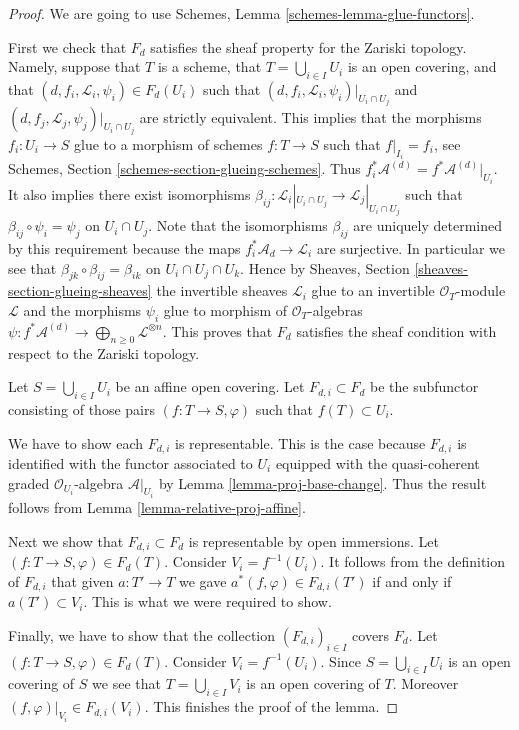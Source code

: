 \begin{proof}
We are going to use Schemes, Lemma \ref{schemes-lemma-glue-functors}.

\medskip\noindent
First we check that $F_d$ satisfies the sheaf property for the
Zariski topology. Namely, suppose that $T$ is a scheme,
that $T = \bigcup_{i \in I} U_i$ is an open covering,
and that $(d, f_i, \mathcal{L}_i, \psi_i) \in F_d(U_i)$ such that
$(d, f_i, \mathcal{L}_i, \psi_i)|_{U_i \cap U_j}$ and
$(d, f_j, \mathcal{L}_j, \psi_j)|_{U_i \cap U_j}$ are strictly
equivalent. This implies that the morphisms $f_i : U_i \to S$
glue to a morphism of schemes $f : T \to S$ such that
$f|_{I_i} = f_i$, see Schemes, Section \ref{schemes-section-glueing-schemes}.
Thus $f_i^*\mathcal{A}^{(d)} = f^*\mathcal{A}^{(d)}|_{U_i}$.
It also implies there exist isomorphisms
$\beta_{ij} : \mathcal{L}_i|_{U_i \cap U_j} \to \mathcal{L}_j|_{U_i \cap U_j}$
such that $\beta_{ij} \circ \psi_i = \psi_j$ on $U_i \cap U_j$.
Note that the isomorphisms $\beta_{ij}$ are uniquely determined
by this requirement because the maps $f_i^*\mathcal{A}_d \to \mathcal{L}_i$
are surjective. In particular we see that
$\beta_{jk} \circ \beta_{ij} = \beta_{ik}$ on $U_i \cap U_j \cap U_k$.
Hence by Sheaves,
Section \ref{sheaves-section-glueing-sheaves} the invertible sheaves
$\mathcal{L}_i$ glue to an invertible $\mathcal{O}_T$-module
$\mathcal{L}$ and the morphisms $\psi_i$ glue to
morphism of $\mathcal{O}_T$-algebras
$\psi : f^*\mathcal{A}^{(d)} \to \bigoplus_{n \geq 0} \mathcal{L}^{\otimes n}$.
This proves that $F_d$ satisfies the sheaf condition with respect to
the Zariski topology.

\medskip\noindent
Let $S = \bigcup_{i \in I} U_i$ be an affine open covering.
Let $F_{d, i} \subset F_d$ be the subfunctor consisting of
those pairs $(f : T \to S, \varphi)$ such that
$f(T) \subset U_i$.

\medskip\noindent
We have to show each $F_{d, i}$ is representable.
This is the case because $F_{d, i}$ is identified with
the functor associated to $U_i$ equipped with
the quasi-coherent graded $\mathcal{O}_{U_i}$-algebra
$\mathcal{A}|_{U_i}$ by Lemma \ref{lemma-proj-base-change}.
Thus the result follows from Lemma \ref{lemma-relative-proj-affine}.

\medskip\noindent
Next we show that $F_{d, i} \subset F_d$ is representable by open immersions.
Let $(f : T \to S, \varphi) \in F_d(T)$. Consider $V_i = f^{-1}(U_i)$.
It follows from the definition of $F_{d, i}$ that given $a : T' \to T$
we gave $a^*(f, \varphi) \in F_{d, i}(T')$ if and only if $a(T') \subset V_i$.
This is what we were required to show.

\medskip\noindent
Finally, we have to show that the collection $(F_{d, i})_{i \in I}$
covers $F_d$. Let $(f : T \to S, \varphi) \in F_d(T)$.
Consider $V_i = f^{-1}(U_i)$. Since $S = \bigcup_{i \in I} U_i$
is an open covering of $S$ we see that $T = \bigcup_{i \in I} V_i$
is an open covering of $T$. Moreover $(f, \varphi)|_{V_i} \in F_{d, i}(V_i)$.
This finishes the proof of the lemma.
\end{proof}

